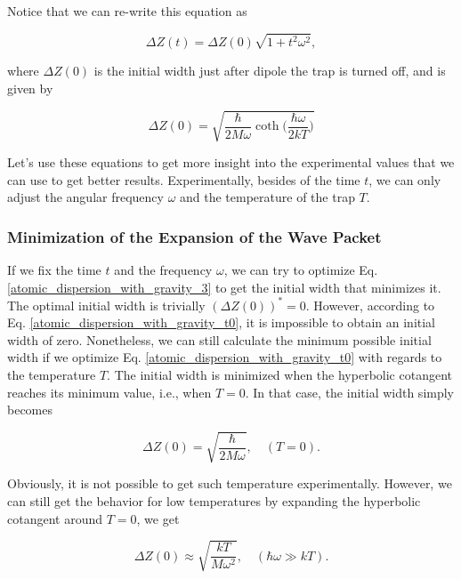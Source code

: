 \documentclass{article}
\begin{document}
Notice that we can re-write this equation as

\begin{equation}\label{atomic_dispersion_with_gravity_3}
    \Delta Z (t) = \Delta Z(0) \sqrt{1+t^{2}\omega^{2}},
\end{equation}

where $\Delta Z(0)$ is the initial width just after dipole the trap is turned off, and is given by

\begin{equation}\label{atomic_dispersion_with_gravity_t0}
    \Delta Z(0) = \sqrt{\frac{\hbar}{2M \omega} \coth \bigg(\frac{\hbar \omega}{2kT} \bigg)}
\end{equation}

Let's use these equations to get more insight into the experimental values that we can use to get better results. Experimentally, besides of the time $t$, we can only adjust the angular frequency $\omega$ and the temperature of the trap $T$.

\subsubsection{Minimization of the Expansion of the Wave Packet}
If we fix the time $t$ and the frequency $\omega$, we can try to optimize Eq. \ref{atomic_dispersion_with_gravity_3} to get the initial width that minimizes it. The optimal initial width is trivially $(\Delta Z(0))^{*}=0$. However, according to Eq. \ref{atomic_dispersion_with_gravity_t0}, it is impossible to obtain an initial width of zero. Nonetheless, we can still calculate the minimum possible initial width if we optimize Eq. \ref{atomic_dispersion_with_gravity_t0} with regards to the temperature $T$. The initial width is minimized when the hyperbolic cotangent reaches its minimum value, i.e., when $T= 0$. In that case, the initial width simply becomes

\begin{equation}
    \Delta Z(0) = \sqrt{\frac{\hbar}{2M \omega} } , \quad (T=0).
\end{equation}

Obviously, it is not possible to get such temperature experimentally. However, we can still get the behavior for low temperatures by expanding the hyperbolic cotangent around $T=0$, we get

\begin{equation}
    \Delta Z (0) \approx \sqrt{\frac{ kT}{ M \omega^{2}}  }, \quad (\hbar \omega \gg kT).
\end{equation}
\end{document}
